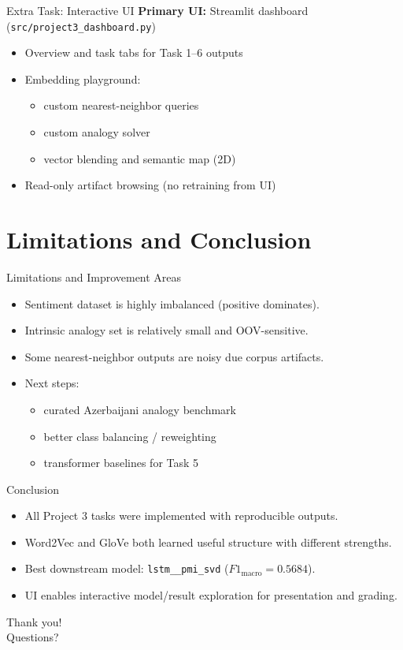 \documentclass{beamer}
\newcommand{\fmacro}{F1_{\text{macro}}}
\begin{document}
\begin{frame}{Extra Task: Interactive UI}
\small
\textbf{Primary UI:} Streamlit dashboard (\texttt{src/project3\_dashboard.py})
\begin{itemize}
  \item Overview and task tabs for Task 1--6 outputs
  \item Embedding playground:
  \begin{itemize}
    \item custom nearest-neighbor queries
    \item custom analogy solver
    \item vector blending and semantic map (2D)
  \end{itemize}
  \item Read-only artifact browsing (no retraining from UI)
\end{itemize}
\end{frame}

\section{Limitations and Conclusion}

\begin{frame}{Limitations and Improvement Areas}
\small
\begin{itemize}
  \item Sentiment dataset is highly imbalanced (positive dominates).
  \item Intrinsic analogy set is relatively small and OOV-sensitive.
  \item Some nearest-neighbor outputs are noisy due corpus artifacts.
  \item Next steps:
  \begin{itemize}
    \item curated Azerbaijani analogy benchmark
    \item better class balancing / reweighting
    \item transformer baselines for Task 5
  \end{itemize}
\end{itemize}
\end{frame}

\begin{frame}{Conclusion}
\small
\begin{itemize}
  \item All Project 3 tasks were implemented with reproducible outputs.
  \item Word2Vec and GloVe both learned useful structure with different strengths.
  \item Best downstream model: \texttt{lstm\_\_pmi\_svd} (\(\fmacro=0.5684\)).
  \item UI enables interactive model/result exploration for presentation and grading.
\end{itemize}

\vspace{0.7em}
\centering
\Large Thank you! \\[0.3em]
\normalsize Questions?
\end{frame}
\end{document}
